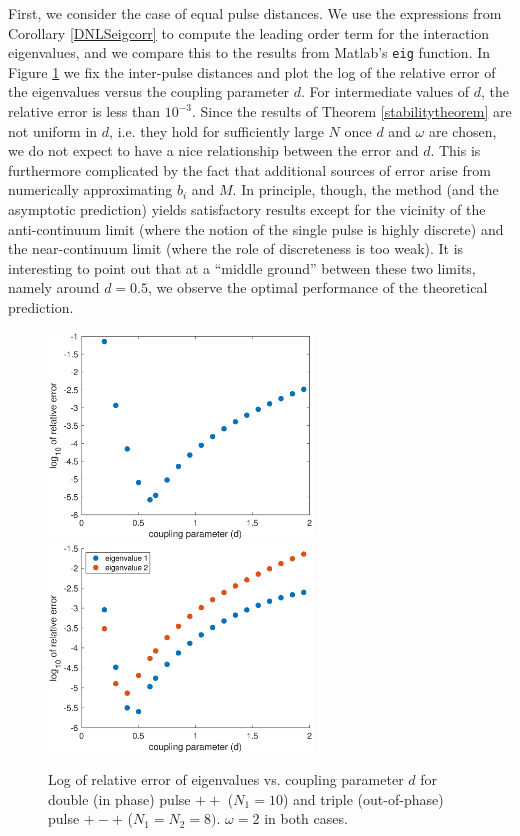 \documentclass[12pt]{elsarticle}
\begin{document}
First, we consider the case of equal pulse distances. We use the expressions from Corollary \ref{DNLSeigcorr} to compute the leading order term for the interaction eigenvalues, and we compare this to the results from Matlab's \texttt{eig} function. In Figure \ref{fig:error1} we fix the inter-pulse distances and plot the log of the relative error of the eigenvalues versus the coupling parameter $d$. For intermediate values of $d$, the relative error is less than $10^{-3}$. Since the results of Theorem \eqref{stabilitytheorem} are not uniform in $d$, i.e. they hold for sufficiently large $N$ once $d$ and $\omega$ are chosen, we do not expect to have a nice relationship between the error and $d$. This is furthermore complicated by the fact that additional sources of error arise from  
numerically approximating $b_i$ and $M$. In principle, though, the method (and the asymptotic prediction) yields
satisfactory results except for the vicinity of the 
anti-continuum limit (where the notion of the single
pulse is highly discrete) and the near-continuum limit
(where the role of discreteness is too weak). 
It is interesting to point out that at a ``middle
ground'' between these two limits, namely around $d=0.5$,
we observe the optimal performance of the theoretical
prediction. 

\begin{figure}[H]
\centering
\includegraphics[width=7cm]{errors1.eps}
\includegraphics[width=7cm]{errors2.eps}
\caption{Log of relative error of eigenvalues vs. coupling parameter $d$ for double (in phase) 
pulse $++$ ($N_1 = 10$) and triple (out-of-phase) pulse $+-+$ ($N_1 = N_2 = 8)$. $\omega = 2$ in both cases.}
\label{fig:error1}
\end{figure}
\end{document}
